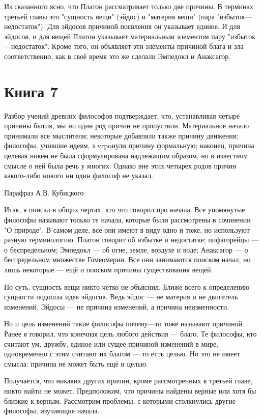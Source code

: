 \documentclass[oneside, 17pt, dvipsnames]{extbook}
\begin{document}
Из сказанного ясно, что Платон рассматривает только две причины. В терминах третьей главы это "сущность вещи" (эйдос) и "материя вещи" (пара "избыток---недостаток"). Для эйдосов причиной появления он указывает единое. И для эйдосов, и для вещей Платон указывает материальным элементом пару "избыток---недостаток". Кроме того, он объявляет эти элементы причиной блага и зла соответственно, как в своё время это же сделали Эмпедокл и Анаксагор.






\newpage
\section{Книга 7}

\epigraph{
Разбор учений древних философов подтверждает, что, устанавливая четыре причины бытия, мы ни один род причин не пропустили. Материальное начало принимали все мыслители; некоторые добавляли также причину движения; философы, учившие идеям, з vrpoнули причину формальную; наконец, причина целевая никем не была сформулирована надлежащим образом, но в известном смысле о ней была речь у многих. Однако вне этих четырех родов причин какого-либо нового ни один философ не указал.
}{Парафраз А.В. Кубицкого}

Итак, я описал в общих чертах, кто что говорил про начала. Все упомянутые философы называют только те начала, которые были рассмотрены в сочинении "О природе". В самом деле, все они имеют в виду одно и тоже, но используют разную терминологию. Платон говорит об избытке и недостатке; пифагорейцы --- о беспредельном; Эмпедокл --- об огне, земле, воздухе и воде; Анаксагор --- о беспредельном множестве Гомеомерии. Все они занимаются поиском начал, но лишь некоторые --- ещё и поиском причины существования вещей.

Но суть, сущность вещи никто чётко не объяснил. Ближе всего к определению сущности подошла идея эйдосов. Ведь эйдос --- не материя и не двигатель изменений. Эйдосы --- не причина изменений, а причина неизменности.

Но и цель изменений такие философы почему---то тоже называют причиной. Ранее я говорил, что конечная цель любого действия --- благо. Те философы, кто считают ум, дружбу, единое или сущее причиной изменений в мире, одновременно с этим считают их благом --- то есть целью. Но это не имеет смысла: причина не может быть ещё и целью.

Получается, что никаких других причин, кроме рассмотренных в третьей главе, никто найти не может. Предположим, что причины найдены верные или хотя бы близкие к верным. Рассмотрим проблемы, с которыми столкнулись другие философы, изучающие начала.
\end{document}
